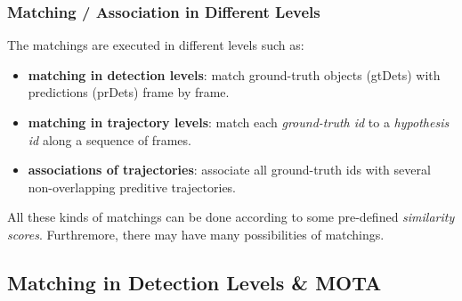 \documentclass[slidetop, mathserif]{beamer}
\begin{document}
\begin{frame}
	\frametitle{Matching / Association in Different Levels}
			
		
	\vspace{4pt}
			
	The matchings are executed in different levels such as:
	\begin{itemize}
		\item {\bf matching in detection levels}:
		      match ground-truth objects (gtDets)
		      with predictions (prDets) frame by frame.
		\item {\bf matching in trajectory levels}:
		      match each \emph{ground-truth id} to a \emph{hypothesis id}
			  along a sequence of frames.
		\item {\bf associations of trajectories}:
		      associate all ground-truth ids with several non-overlapping preditive trajectories.
	\end{itemize}
		

	All these kinds of matchings can be done according to some pre-defined \emph{similarity scores}.
	Furthremore, there may have many possibilities of matchings.
			
\end{frame}

\subsection{Matching in Detection Levels \& MOTA}
\end{document}
